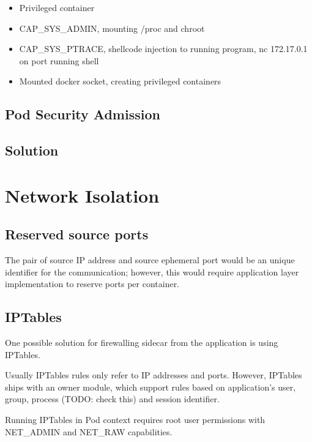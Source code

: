 \documentclass[english, 12pt, a4paper, sci, utf8, a-2b, online]{aaltothesis}
\begin{document}
\cite{nsa-cisa-hardening}




\begin{itemize}
  \item Privileged container
  \item CAP\_SYS\_ADMIN, mounting /proc and chroot
  \item CAP\_SYS\_PTRACE, shellcode injection to running program, nc 172.17.0.1 on port running shell
  \item Mounted docker socket, creating privileged containers
\end{itemize}

\subsection{Pod Security Admission}

\subsection{Solution}

\clearpage

\section{Network Isolation} \label{sec:network-solution}

\subsection{Reserved source ports}

The pair of source IP address and source ephemeral port would be an unique identifier for the communication; however, this would require application layer implementation to reserve ports per container.

\subsection{IPTables}

One possible solution for firewalling sidecar from the application is using IPTables.

Usually IPTables rules only refer to IP addresses and ports. However, IPTables ships with an owner module, which support rules based on application's user, group, process (TODO: check this) and session identifier.

Running IPTables in Pod context requires root user permissions with NET\_ADMIN and NET\_RAW capabilities.
\end{document}
